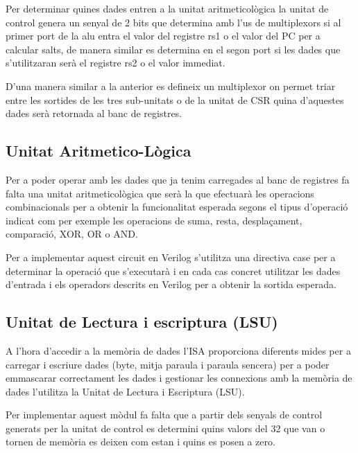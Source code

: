 \documentclass[10pt,a4paper,twocolumn,twoside]{article}
\begin{document}
    Per determinar quines dades entren a la unitat aritmeticològica la unitat de control genera un senyal de 2 bits que determina amb l'us de multiplexors si al primer port de la alu entra el valor del registre rs1 o el valor del PC per a calcular salts, de manera similar es determina en el segon port si les dades que s'utilitzaran serà el registre rs2 o el valor immediat.
    
    D'una manera similar a la anterior es defineix un multiplexor on permet triar entre les sortides de les tres sub-unitats o de la unitat de CSR quina d'aquestes dades serà retornada al banc de registres.
    
    
    
    
    

    
    
    \subsection{Unitat Aritmetico-Lògica}
    Per a poder operar amb les dades que ja tenim carregades al banc de registres fa falta una unitat aritmeticològica que serà la que efectuarà les operacions combinacionals per a obtenir la funcionalitat esperada segons el tipus d'operació indicat com per exemple  les operacions de suma, resta, desplaçament, comparació, XOR, OR o AND.
    
    Per a implementar aquest circuit en Verilog s'utilitza una directiva case per a determinar la operació que s'executarà i en cada cas concret utilitzar les dades d'entrada i els operadors descrits en Verilog per a obtenir la sortida esperada.
    
    \subsection{Unitat de Lectura i escriptura (LSU)}
    A l'hora d'accedir a la memòria de dades l'ISA proporciona diferents mides per a carregar i escriure dades (byte, mitja paraula i paraula sencera) per a poder emmascarar correctament les dades i  gestionar les connexions amb la memòria de dades l'utilitza la Unitat de Lectura i Escriptura (LSU). 
    
    Per implementar aquest mòdul fa falta que a partir dels senyals de control generats per la unitat de control es determini quins valors del 32 que van o tornen de memòria es deixen com estan i quins es posen a zero.
    
\end{document}
